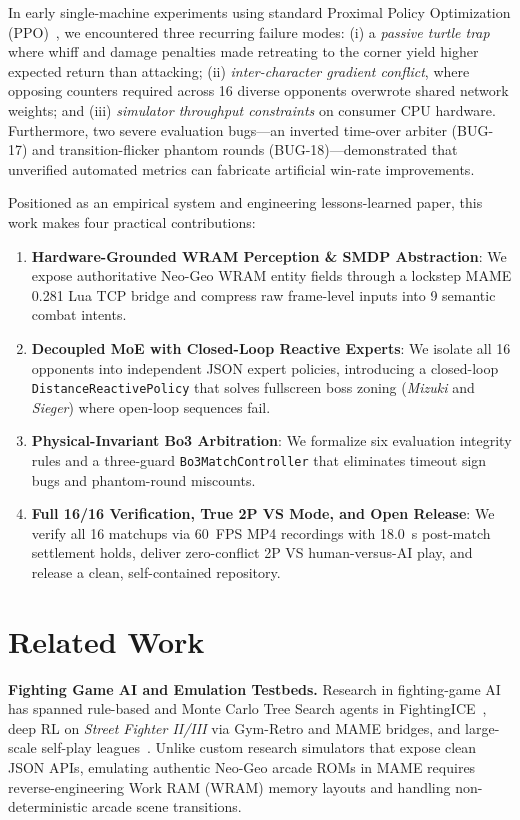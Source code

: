 \documentclass[10pt,twocolumn]{article}
\begin{document}
In early single-machine experiments using standard Proximal Policy Optimization (PPO)~\cite{schulman2017ppo}, we encountered three recurring failure modes: (i) a \emph{passive turtle trap} where whiff and damage penalties made retreating to the corner yield higher expected return than attacking; (ii) \emph{inter-character gradient conflict}, where opposing counters required across 16 diverse opponents overwrote shared network weights; and (iii) \emph{simulator throughput constraints} on consumer CPU hardware. Furthermore, two severe evaluation bugs—an inverted time-over arbiter (BUG-17) and transition-flicker phantom rounds (BUG-18)—demonstrated that unverified automated metrics can fabricate artificial win-rate improvements.

Positioned as an empirical system and engineering lessons-learned paper, this work makes four practical contributions:
\begin{enumerate}
    \item \textbf{Hardware-Grounded WRAM Perception \& SMDP Abstraction}: We expose authoritative Neo-Geo WRAM entity fields through a lockstep MAME 0.281 Lua TCP bridge and compress raw frame-level inputs into 9 semantic combat intents.
    \item \textbf{Decoupled MoE with Closed-Loop Reactive Experts}: We isolate all 16 opponents into independent JSON expert policies, introducing a closed-loop \texttt{DistanceReactivePolicy} that solves fullscreen boss zoning (\textit{Mizuki} and \textit{Sieger}) where open-loop sequences fail.
    \item \textbf{Physical-Invariant Bo3 Arbitration}: We formalize six evaluation integrity rules and a three-guard \texttt{Bo3MatchController} that eliminates timeout sign bugs and phantom-round miscounts.
    \item \textbf{Full 16/16 Verification, True 2P VS Mode, and Open Release}: We verify all 16 matchups via 60~FPS MP4 recordings with 18.0~s post-match settlement holds, deliver zero-conflict 2P VS human-versus-AI play, and release a clean, self-contained repository.
\end{enumerate}

\section{Related Work}
\textbf{Fighting Game AI and Emulation Testbeds.} Research in fighting-game AI has spanned rule-based and Monte Carlo Tree Search agents in FightingICE~\cite{lu2013fightingice}, deep RL on \textit{Street Fighter II/III} via Gym-Retro and MAME bridges, and large-scale self-play leagues~\cite{vinyals2019alphastar}. Unlike custom research simulators that expose clean JSON APIs, emulating authentic Neo-Geo arcade ROMs in MAME requires reverse-engineering Work RAM (WRAM) memory layouts and handling non-deterministic arcade scene transitions.
\end{document}
